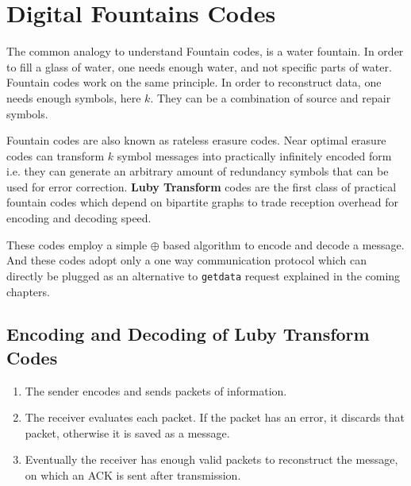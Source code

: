 \section{Digital Fountains Codes}
The common analogy to understand Fountain codes, is a water fountain. In order to fill a
glass of water, one needs enough water, and not specific parts of water.
Fountain codes work on the same principle. In order to reconstruct data, one
needs enough symbols, here $k$. They can be a combination of source and repair
symbols.

Fountain codes are also known as rateless erasure codes. Near optimal erasure
codes \citep{efficient-erasure} can transform $k$ symbol messages into practically infinitely encoded form
i.e. they can generate an arbitrary amount of redundancy symbols that can be
used for error correction.
\textbf{Luby Transform} \citep{lt} codes are the first class of practical fountain codes
which depend on bipartite graphs to trade reception overhead for encoding
and decoding speed. 

These codes employ a simple $\oplus $ based algorithm to encode and decode a
message. And these codes adopt only a one way communication protocol which can
directly be plugged as an alternative to \texttt{getdata} request explained in
the coming chapters.

\subsection{Encoding and Decoding of Luby Transform Codes}
\begin{enumerate}
    \item The sender encodes and sends packets of information.
    \item The receiver evaluates each packet. If the packet has an error, it
        discards that packet, otherwise it is saved as a message.
    \item Eventually the receiver has enough valid packets to reconstruct the
        message, on which an ACK is sent after transmission.
\end{enumerate}

